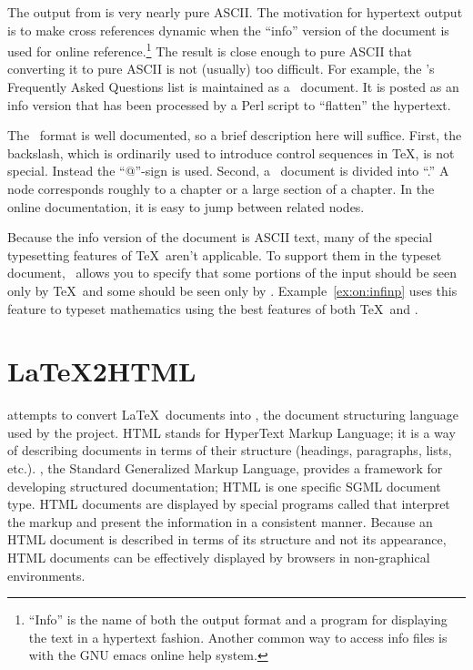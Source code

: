 The output from  is very nearly pure ASCII.  The
motivation for {hypertext} output is to make cross 
references dynamic when 
the ``info'' version of the document is used for online
reference.\footnote{``Info'' is the name of both the output format and a
program for displaying the text in a hypertext fashion.  Another common
way to access info files is with the GNU emacs online help system.}  
The result is close enough to pure ASCII that converting
it to pure ASCII is not (usually) too difficult.  For example, the
's Frequently Asked Questions list is 
maintained as a \TeXinfo\ document. It is 
posted as an info version that has been processed
by a Perl script to ``flatten'' the hypertext.

The \TeXinfo\ format is well documented, so a brief description here
will suffice.  First, the backslash, which is ordinarily
used to introduce control sequences in \TeX, is not special.  Instead
the ``@''-sign is used.  Second, a
\TeXinfo\ document is divided into ``.''  A node corresponds
roughly to a chapter or a large section of a chapter.  In the online
documentation, it is easy to jump between related nodes. 

Because the info version of the document is ASCII text, many
of the special typesetting features of \TeX\ aren't applicable.
To support them in the typeset document, \TeXinfo\ allows you to
specify that some portions of the input should be seen only by \TeX\
and some should be seen only by .
Example~\ref{ex:on:infinp} uses this feature to typeset
mathematics using the best features of both \TeX\ and .

\section{\protect\LaTeX2HTML}

 attempts 
to convert \LaTeX\ documents into , the
document structuring language used by the  project.
HTML stands for HyperText Markup 
Language; it is a way of describing
documents in terms of their structure (headings, paragraphs, lists,
etc.).  
, the Standard Generalized Markup Language,
provides
a framework for developing structured documentation; HTML is one specific
SGML document type.
HTML documents are displayed by special programs called
 that interpret the markup and present the information in a
consistent manner.  Because an HTML document is described in
terms of its structure and not its appearance, HTML documents can be
effectively displayed by browsers in non-graphical environments.

